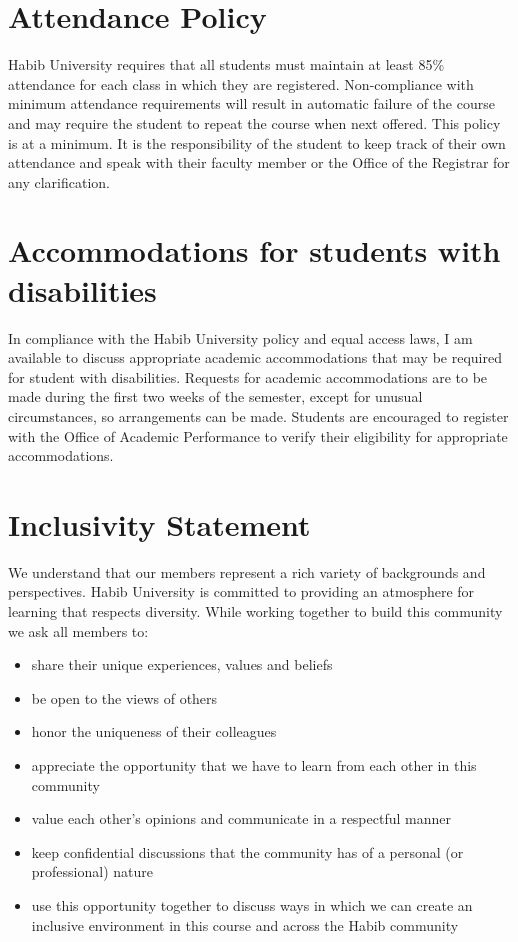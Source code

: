 \documentclass[a4paper]{article}
\begin{document}
\section{Attendance Policy}

Habib University requires that all 
students
must maintain at least 85\% attendance for 
each class in which they are registered. Non-compliance with minimum attendance 
requirements  will  result  in  automatic  failure  of  the  course  and  may  require  the 
student to
repeat the course when next offered. This policy is at a minimum. It is the 
responsibility  of  the  student  to  keep  track  of  their  own  attendance  and  speak  with 
their faculty member or the Office of the Registrar for any clarification. 


\section{Accommodations for students with disabilities}

In compliance with the Habib University policy and equal access laws, I am available to discuss appropriate academic accommodations that may be required for student with disabilities. Requests for academic accommodations are to be made during the first two weeks of the semester, except for unusual circumstances, so arrangements can be made. Students are encouraged to register with the Office of Academic Performance to verify their eligibility for appropriate accommodations.

\section{Inclusivity Statement}
We understand that our members represent a rich variety of backgrounds and perspectives. Habib University is committed to providing an atmosphere for learning that respects diversity. While working together to build this community we ask all members to:
\begin{itemize}
	\item share their unique experiences, values and beliefs
	\item be open to the views of others 
	\item honor the uniqueness of their colleagues
	\item appreciate the opportunity that we have to learn from each other in this community
	\item value each other's opinions and communicate in a respectful manner
	\item keep confidential discussions that the community has of a personal (or professional) nature 
	\item use this opportunity together to discuss ways in which we can create an inclusive environment in this course and across the Habib community 
\end{itemize}
\end{document}
